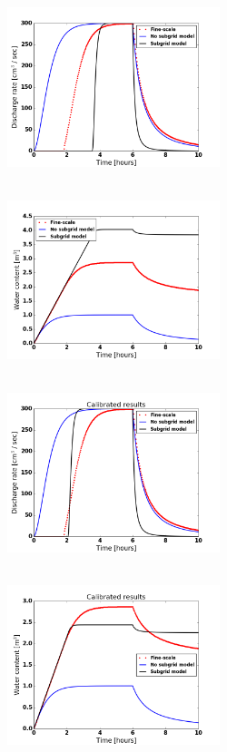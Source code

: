 \documentclass[review,11pt]{elsarticle}
\begin{document}
\begin{figure}[!h]
\centering
\includegraphics[width=6.2cm, height=5.5cm]{./figures/POLYGON_B01/POLYGON_B01discharge.png}
\includegraphics[width=6.2cm, height=5.5cm]{./figures/POLYGON_B01/POLYGON_B01watercontent.png}\\
\includegraphics[width=6.2cm, height=5.5cm]{./figures/POLYGON_B01/POLYGON_B01dischargeCalibDD.png}
\includegraphics[width=6.2cm, height=5.5cm]{./figures/POLYGON_B01/POLYGON_B01watercontentCalibDD.png} \\

\end{figure}
\end{document}
